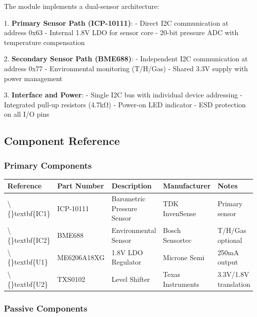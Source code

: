 \documentclass[11pt,a4paper]{article}
\begin{document}
The module implements a dual-sensor architecture:

1. \textbf{Primary Sensor Path (ICP-10111)}:
   - Direct I2C communication at address 0x63
   - Internal 1.8V LDO for sensor core
   - 20-bit pressure ADC with temperature compensation

2. \textbf{Secondary Sensor Path (BME688)}:
   - Independent I2C communication at address 0x77  
   - Environmental monitoring (T/H/Gas)
   - Shared 3.3V supply with power management

3. \textbf{Interface and Power}:
   - Single I2C bus with individual device addressing
   - Integrated pull-up resistors (4.7kΩ)
   - Power-on LED indicator
   - ESD protection on all I/O pins

\subsection{Component Reference}

\subsubsection{Primary Components}

\begin{table}[H]
\centering
\begin{tabular}{lllll}
\toprule
Reference & Part Number & Description & Manufacturer & Notes \\
\midrule
\textbackslash\{\}textbf\{IC1\} & ICP-10111 & Barometric Pressure Sensor & TDK InvenSense & Primary sensor \\
\textbackslash\{\}textbf\{IC2\} & BME688 & Environmental Sensor & Bosch Sensortec & T/H/Gas optional \\
\textbackslash\{\}textbf\{U1\} & ME6206A18XG & 1.8V LDO Regulator & Microne Semi & 250mA output \\
\textbackslash\{\}textbf\{U2\} & TXS0102 & Level Shifter & Texas Instruments & 3.3V/1.8V translation \\
\bottomrule
\end{tabular}
\end{table}


\subsubsection{Passive Components}
\end{document}
